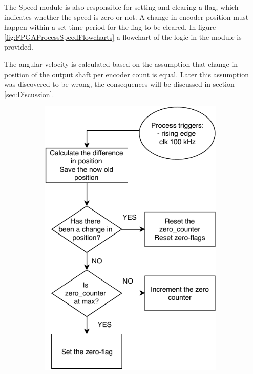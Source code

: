 \documentclass[../../main.tex]{subfiles}
\begin{document}
The Speed module is also responsible for setting and clearing a flag, which indicates whether the speed is zero or not. A change in encoder position must happen within a set time period for the flag to be cleared. In figure \ref{fig:FPGAProcessSpeedFlowcharts} a flowchart of the logic in the module is provided.

The angular velocity is calculated based on the assumption that change in position of the output shaft per encoder count is equal. Later this assumption was discovered to be wrong, the consequences will be discussed in section \ref{sec:Discussion}.

\begin{figure}[h]
\begin{subfigure}{0.48\textwidth}
    \includegraphics[width = 0.97\textwidth]{Sections/System_Implementation/Images/FPGAProcessSpeedZeroFlowchart.pdf}

\end{subfigure}
\end{figure}
\end{document}
